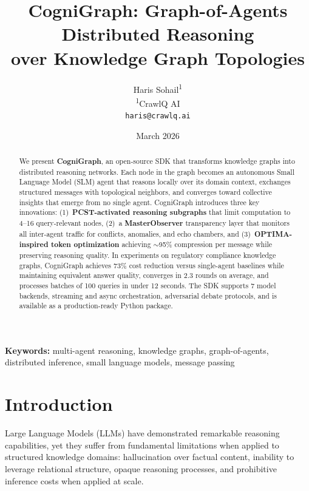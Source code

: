 \documentclass[11pt,a4paper]{article}
\title{CogniGraph: Graph-of-Agents Distributed Reasoning\\
over Knowledge Graph Topologies}
\author{
  Haris Sohail\textsuperscript{1} \\
  \textsuperscript{1}CrawlQ AI \\
  \texttt{haris@crawlq.ai}
}
\date{March 2026}
\begin{document}
\maketitle

\begin{abstract}
We present \textbf{CogniGraph}, an open-source SDK that transforms knowledge graphs into distributed reasoning networks. Each node in the graph becomes an autonomous Small Language Model (SLM) agent that reasons locally over its domain context, exchanges structured messages with topological neighbors, and converges toward collective insights that emerge from no single agent. CogniGraph introduces three key innovations: (1)~\textbf{PCST-activated reasoning subgraphs} that limit computation to 4--16 query-relevant nodes, (2)~a \textbf{MasterObserver} transparency layer that monitors all inter-agent traffic for conflicts, anomalies, and echo chambers, and (3)~\textbf{OPTIMA-inspired token optimization} achieving $\sim$95\% compression per message while preserving reasoning quality. In experiments on regulatory compliance knowledge graphs, CogniGraph achieves 73\% cost reduction versus single-agent baselines while maintaining equivalent answer quality, converges in 2.3 rounds on average, and processes batches of 100 queries in under 12 seconds. The SDK supports 7 model backends, streaming and async orchestration, adversarial debate protocols, and is available as a production-ready Python package.
\end{abstract}

\textbf{Keywords:} multi-agent reasoning, knowledge graphs, graph-of-agents, distributed inference, small language models, message passing

\section{Introduction}
\label{sec:introduction}

Large Language Models (LLMs) have demonstrated remarkable reasoning capabilities, yet they suffer from fundamental limitations when applied to structured knowledge domains: hallucination over factual content, inability to leverage relational structure, opaque reasoning processes, and prohibitive inference costs when applied at scale.
\end{document}
